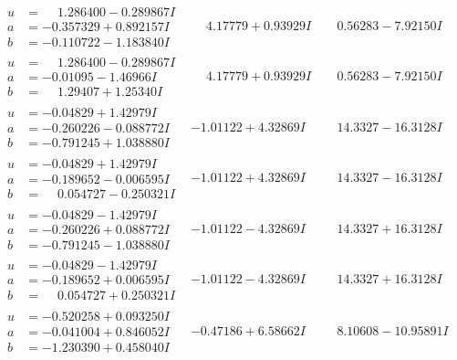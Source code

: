 \documentclass[1p]{elsarticle_modified}
\theoremstyle{definition}
\begin{document}
$$\begin{array}{c|c|c}
\begin{aligned}
u &= \phantom{-}1.286400 - 0.289867 I \\
a &= -0.357329 + 0.892157 I \\
b &= -0.110722 - 1.183840 I\end{aligned}
 & \phantom{-}4.17779 + 0.93929 I & \phantom{-}0.56283 - 7.92150 I \\ \hline\begin{aligned}
u &= \phantom{-}1.286400 - 0.289867 I \\
a &= -0.01095 - 1.46966 I \\
b &= \phantom{-}1.29407 + 1.25340 I\end{aligned}
 & \phantom{-}4.17779 + 0.93929 I & \phantom{-}0.56283 - 7.92150 I \\ \hline\begin{aligned}
u &= -0.04829 + 1.42979 I \\
a &= -0.260226 - 0.088772 I \\
b &= -0.791245 + 1.038880 I\end{aligned}
 & -1.01122 + 4.32869 I & \phantom{-}14.3327 - 16.3128 I \\ \hline\begin{aligned}
u &= -0.04829 + 1.42979 I \\
a &= -0.189652 - 0.006595 I \\
b &= \phantom{-}0.054727 - 0.250321 I\end{aligned}
 & -1.01122 + 4.32869 I & \phantom{-}14.3327 - 16.3128 I \\ \hline\begin{aligned}
u &= -0.04829 - 1.42979 I \\
a &= -0.260226 + 0.088772 I \\
b &= -0.791245 - 1.038880 I\end{aligned}
 & -1.01122 - 4.32869 I & \phantom{-}14.3327 + 16.3128 I \\ \hline\begin{aligned}
u &= -0.04829 - 1.42979 I \\
a &= -0.189652 + 0.006595 I \\
b &= \phantom{-}0.054727 + 0.250321 I\end{aligned}
 & -1.01122 - 4.32869 I & \phantom{-}14.3327 + 16.3128 I \\ \hline\begin{aligned}
u &= -0.520258 + 0.093250 I \\
a &= -0.041004 + 0.846052 I \\
b &= -1.230390 + 0.458040 I\end{aligned}
 & -0.47186 + 6.58662 I & \phantom{-}8.10608 - 10.95891 I \\ \hline\begin{aligned}

\end{aligned}
\end{array}$$
\end{document}
